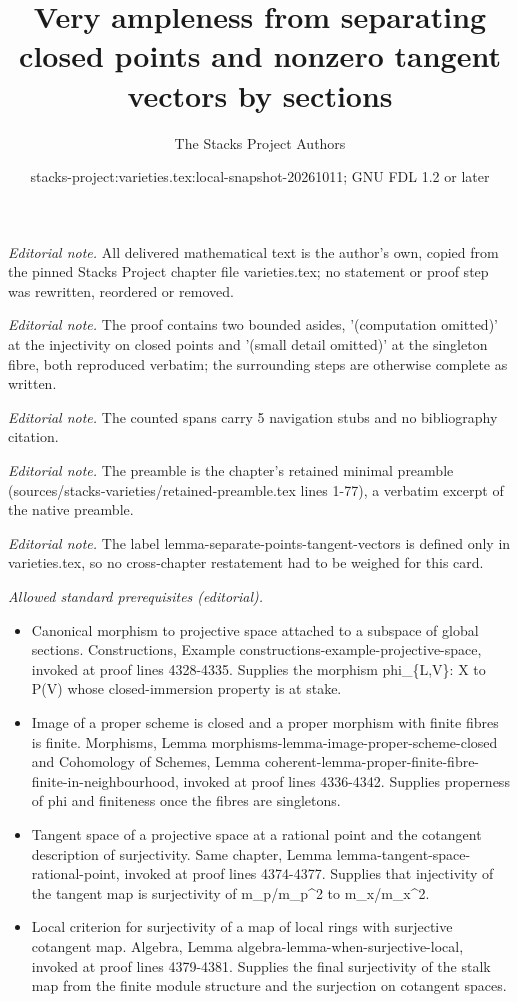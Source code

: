 \documentclass[10pt,a4paper]{amsart}
\title{Very ampleness from separating closed points and nonzero tangent vectors by sections}
\author{The Stacks Project Authors}
\date{stacks-project:varieties.tex:local-snapshot-20261011; GNU FDL 1.2 or later}
\theoremstyle{plain}
\theoremstyle{definition}
\theoremstyle{remark}
\numberwithin{equation}{subsection}
\begin{document}
\maketitle
\noindent\textit{Editorial note.} All delivered mathematical text is the author's own, copied from the pinned Stacks Project chapter file varieties.tex; no statement or proof step was rewritten, reordered or removed.\par\medskip
\noindent\textit{Editorial note.} The proof contains two bounded asides, '(computation omitted)' at the injectivity on closed points and '(small detail omitted)' at the singleton fibre, both reproduced verbatim; the surrounding steps are otherwise complete as written.\par\medskip
\noindent\textit{Editorial note.} The counted spans carry 5 navigation stubs and no bibliography citation.\par\medskip
\noindent\textit{Editorial note.} The preamble is the chapter's retained minimal preamble (sources/stacks-varieties/retained-preamble.tex lines 1-77), a verbatim excerpt of the native preamble.\par\medskip
\noindent\textit{Editorial note.} The label lemma-separate-points-tangent-vectors is defined only in varieties.tex, so no cross-chapter restatement had to be weighed for this card.\par\medskip
\noindent\textit{Allowed standard prerequisites (editorial).}\begin{itemize}
\item Canonical morphism to projective space attached to a subspace of global sections. Constructions, Example constructions-example-projective-space, invoked at proof lines 4328-4335. Supplies the morphism phi\_\{L,V\}: X to P(V) whose closed-immersion property is at stake.
\item Image of a proper scheme is closed and a proper morphism with finite fibres is finite. Morphisms, Lemma morphisms-lemma-image-proper-scheme-closed and Cohomology of Schemes, Lemma coherent-lemma-proper-finite-fibre-finite-in-neighbourhood, invoked at proof lines 4336-4342. Supplies properness of phi and finiteness once the fibres are singletons.
\item Tangent space of a projective space at a rational point and the cotangent description of surjectivity. Same chapter, Lemma lemma-tangent-space-rational-point, invoked at proof lines 4374-4377. Supplies that injectivity of the tangent map is surjectivity of m\_p/m\_p\textasciicircum{}2 to m\_x/m\_x\textasciicircum{}2.
\item Local criterion for surjectivity of a map of local rings with surjective cotangent map. Algebra, Lemma algebra-lemma-when-surjective-local, invoked at proof lines 4379-4381. Supplies the final surjectivity of the stalk map from the finite module structure and the surjection on cotangent spaces.
\end{itemize}\medskip
\end{document}
